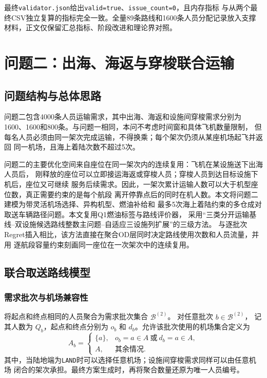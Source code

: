 \documentclass[UTF8,a4paper,zihao=5]{ctexart}
\begin{document}
最终\texttt{validator.json}给出\texttt{valid=true}、\texttt{issue\_count=0}，且内存指标
与从两个最终CSV独立复算的指标完全一致。全量89条路线和1600条人员分配记录放入支撑
材料，正文仅保留汇总指标、阶段改进和理论界对照。

\section{问题二：出海、海返与穿梭联合运输}
\label{sec:q2}

\subsection{问题结构与总体思路}

问题二包含4000条人员运输需求，其中出海、海返和设施间穿梭需求分别为
1600、1600和800条。与问题一相同，本问不考虑时间窗和具体飞机数量限制，
但每名人员必须由同一架次完成运输，不得换乘；每个架次仍须从某座机场起飞并返回
同一机场，且海上着陆次数不超过5次。

问题二的主要优化空间来自座位在同一架次内的连续复用：飞机在某设施送下出海人员后，
刚释放的座位可以立即接运海返或穿梭人员；穿梭人员到达目标设施下机后，座位又可继续
服务后续需求。因此，一架次累计运输人数可以大于机型座位数，真正需要约束的是每个航段
离开停靠点后的同时在机人数。本文将问题二建模为带灵活机场选择、异构机型、燃油补给和
最多5次海上着陆约束的多仓成对取送车辆路径问题。本文复用Q1燃油标签与路线评价器，
采用“三类分开运输基线--双设施候选路线整数主问题--自适应三设施列扩展”的三级方法。
与逐批次Regret插入相比，该方法直接在聚合OD层同时决定路线使用次数和人员流量，并用
逐航段容量约束刻画同一座位在一次架次中的连续复用。

\subsection{联合取送路线模型}

\subsubsection{需求批次与机场兼容性}

将起点和终点相同的人员聚合为需求批次集合 $\mathcal{B}^{(2)}$。
对任意批次 $b\in\mathcal{B}^{(2)}$，
记其人数为 $Q_b$，起点和终点分别为 $o_b$ 和 $d_b$。允许该批次使用的机场集合定义为
\begin{equation}
  A_b=
  \begin{cases}
    \{a\}, & o_b=a\in A\ \text{或}\ d_b=a\in A,\\
    A, & \text{其余情况}.
  \end{cases}
  \label{eq:q2-compatible-airports}
\end{equation}
其中，当陆地端为\texttt{LAND}时可以选择任意机场；设施间穿梭需求同样可以由任意机场
闭合的架次承担。最终方案生成时，再将聚合数量还原为唯一人员编号。
\end{document}
